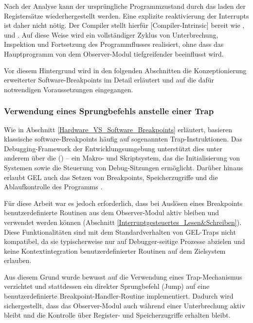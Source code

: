 Nach der Analyse kann der urspr\"ungliche Programmzustand durch das laden der Registers\"atze wiederhergestellt werden. Eine explizite reaktivierung der Interrupts ist daher nicht n\"otig. Der Compiler stellt hierf\"ur [Compiler-Intrinsic] bereit wie ,  und  . Auf diese Weise wird ein vollst\"andiger Zyklus von Unterbrechung, Inspektion und Fortsetzung des Programmflusses realisiert, ohne dass das Hauptprogramm von dem Observer-Modul tiefgreifender beeinflusst wird.

Vor diesem Hintergrund wird in den folgenden Abschnitten die Konzeptionierung erweiterter Software-Breakpoints im Detail erl\"autert und auf die daf\"ur notwendigen Voraussetzungen eingegangen.

\subsubsection{Verwendung eines Sprungbefehls anstelle einer Trap}
\label{sec:JumpVsTrap}

Wie in Abschnitt \ref{Hardware_VS_Software_Breakpoints} erl\"autert, basieren klassische software-Breakpoints h\"aufig auf sogenannten Trap-Instruktionen. Das Debugging-Framework der Entwicklungsumgebung unterst\"utzt dies unter anderem \"uber die  () – ein Makro- und Skriptsystem, das die Initialisierung von Systemen sowie die Steuerung von Debug-Sitzungen erm\"oglicht. Dar\"uber hinaus erlaubt GEL auch das Setzen von Breakpoints, Speicherzugriffe und die Ablaufkontrolle des Programms .

F\"ur diese Arbeit war es jedoch erforderlich, dass bei Ausl\"osen eines Breakpoints benutzerdefinierte Routinen aus dem Observer-Modul aktiv bleiben und verwendet werden k\"onnen (\Vgl Abschnitt \ref{Interruptgesteuertes_Lesen&Schreiben}). Diese Funktionalit\"aten sind mit dem Standardverhalten von GEL-Traps nicht kompatibel, da sie typischerweise nur auf Debugger-seitige Prozesse abzielen und keine Kontextintegration benutzerdefinierter Routinen auf dem Zielsystem erlauben.

Aus diesem Grund wurde bewusst auf die Verwendung eines Trap-Mechanismus verzichtet und stattdessen ein direkter Sprungbefehl (Jump) auf eine benutzerdefinierte Breakpoint-Handler-Routine implementiert. Dadurch wird sichergestellt, dass das Observer-Modul auch w\"ahrend einer Unterbrechung aktiv bleibt und die Kontrolle \"uber Register- und Speicherzugriffe erhalten bleibt.

